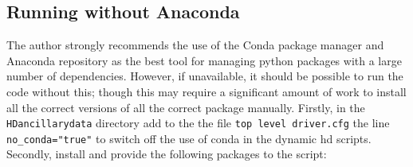 \documentclass{article}
\begin{document}
\subsection{Running without Anaconda}

The author strongly recommends the use of the Conda package manager and Anaconda repository as the best tool for managing python packages with a large number of dependencies. However, if unavailable, it should be possible to run the code without this; though this may require a significant amount of work to install all the correct versions of all the correct package manually. Firstly, in the \lstinline[style=bash_input]{HDancillarydata} directory add to the the file  \lstinline[style=bash_input]{top level driver.cfg} the line \lstinline[style=bash_input]{no_conda="true"} to switch off the use of conda in the dynamic hd scripts. Secondly, install and provide the following packages to the script:
\end{document}
